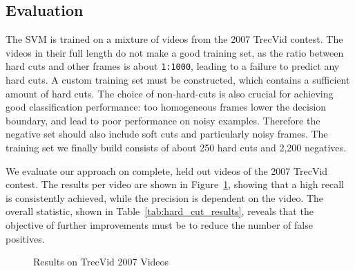 \FloatBarrier
\subsection{Evaluation}
\label{sec:hard_cut_evaluation}

The SVM is trained on a mixture of videos from the 2007 TrecVid contest.
The videos in their full length do not make a good training set, as the ratio between hard cuts and other frames is about \texttt{1:1000}, leading to a failure to predict any hard cuts.
A custom training set must be constructed, which contains a sufficient amount of hard cuts.
The choice of non-hard-cuts is also crucial for achieving good classification performance: too homogeneous frames lower the decision boundary, and lead to poor performance on noisy examples.
Therefore the negative set should also include soft cuts and particularly noisy frames.
The training set we finally build consists of about 250 hard cuts and 2,200 negatives.

We evaluate our approach on complete, held out videos of the 2007 TrecVid contest. The results per video are shown in Figure~\ref{fig:scatterplothceval}, showing that a high recall is consistently achieved, while the precision is dependent on the video. The overall statistic, shown in Table~\ref{tab:hard_cut_results}, reveals that the objective of further improvements must be to reduce the number of false positives.

\begin{figure}[ht]
\centering
{}
\caption{Results on TrecVid 2007 Videos}
\label{fig:scatterplothceval}
\end{figure}

